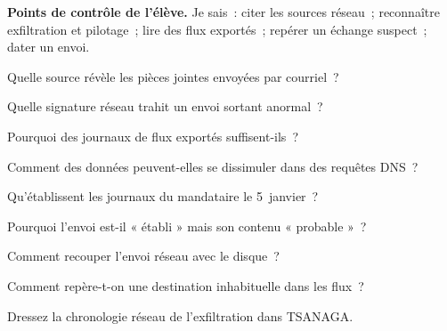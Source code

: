\begin{boxinfo}
\textbf{Points de contrôle de l'élève.} Je sais~: citer les sources réseau~;
reconnaître exfiltration et pilotage~; lire des flux exportés~; repérer un
échange suspect~; dater un envoi.
\end{boxinfo}

\bigskip

\begin{boxexo}[title={\ding{45}\quad Exercice~13.1. Sources \niveaubase}]
Quelle source révèle les pièces jointes envoyées par courriel~?
\end{boxexo}

\begin{boxexo}[title={\ding{45}\quad Exercice~13.2. Exfiltration \niveaubase}]
Quelle signature réseau trahit un envoi sortant anormal~?
\end{boxexo}

\begin{boxexo}[title={\ding{45}\quad Exercice~13.3. Sans capture \niveaubase}]
Pourquoi des journaux de flux exportés suffisent-ils~?
\end{boxexo}

\begin{boxexo}[title={\ding{45}\quad Exercice~13.4. Dissimulation \niveaumoyen}]
Comment des données peuvent-elles se dissimuler dans des requêtes DNS~?
\end{boxexo}

\begin{boxexo}[title={\ding{45}\quad Exercice~13.5. TSANAGA \niveaumoyen}]
Qu'établissent les journaux du mandataire le 5~janvier~?
\end{boxexo}

\begin{boxexo}[title={\ding{45}\quad Exercice~13.6. Contenu \niveaumoyen}]
Pourquoi l'envoi est-il « établi » mais son contenu « probable »~?
\end{boxexo}

\begin{boxexo}[title={\ding{45}\quad Exercice~13.7. Recouper \niveaumoyen}]
Comment recouper l'envoi réseau avec le disque~?
\end{boxexo}

\begin{boxexo}[title={\ding{45}\quad Exercice~13.8. Destination \niveaumoyen}]
Comment repère-t-on une destination inhabituelle dans les flux~?
\end{boxexo}

\begin{boxexo}[title={\ding{45}\quad Exercice~13.9. Chronologie \niveauexpert}]
Dressez la chronologie réseau de l'exfiltration dans TSANAGA.
\end{boxexo}

